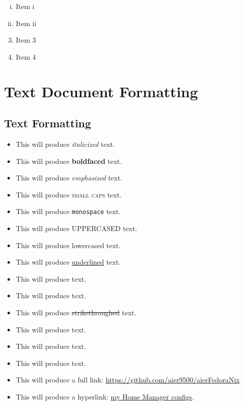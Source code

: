 \documentclass[12pt]{article}
\begin{document}
\begin{enumerate}[i)]
    \item Item i
    \item Item ii
\end{enumerate} \vspace{10pt}

\begin{enumerate} \setcounter{enumi}{2}
    \item Item 3
    \item Item 4
\end{enumerate} \vspace{10pt}


\section{Text Document Formatting}
\subsection{Text Formatting}

\begin{itemize}
    \item This will produce \textit{italicized} text.
    \item This will produce \textbf{boldfaced} text.
    \item This will produce \emph{emphasized} text. %
    \item This will produce \textsc{small caps} text.
    \item This will produce \texttt{monospace} text. 
    \item This will produce \MakeTextUppercase{uppercased} text.
    \item This will produce \MakeTextLowercase{LOWERCASED} text. 
    \item This will produce \uline{underlined} text. 
    \item This will produce  text.
    \item This will produce  text. 
    \item This will produce \sout{strikethroughed} text. 
    \item This will produce  text. 
    \item This will produce  text.
    \item This will produce  text. 
    \item This will produce a full link: \url{https://github.com/aier9500/aierFedoraNix}
    \item This will produce a hyperlink: \href{https://github.com/aier9500/aierFedoraNix}{my Home Manager configs}.
\end{itemize} \vspace{10pt}
\end{document}
